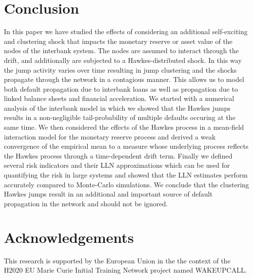 \documentclass[10pt]{article}
\theoremstyle{plain}
\theoremstyle{definition}
\newcommand{\<}{\langle}
\renewcommand{\>}{\rangle}
\renewcommand{\(}{\left(}
\renewcommand{\)}{\right)}
\renewcommand{\[}{\left[}
\renewcommand{\]}{\right]}
\begin{document}
\section{Conclusion}
In this paper we have studied the effects of considering an additional self-exciting and clustering shock that impacts the monetary reserve or asset value of the nodes of the interbank system. The nodes are assumed to interact through the drift, and additionally are subjected to a Hawkes-distributed shock. In this way the jump activity varies over time resulting in jump clustering and the shocks propagate through the network in a contagious manner. This allows us to model both default propagation due to interbank loans as well as propagation due to linked balance sheets and financial acceleration. We started with a numerical analysis of the interbank model in which we showed that the Hawkes jumps results in a non-negligible tail-probability of multiple defaults occuring at the same time. We then considered the effects of the Hawkes process in a mean-field interaction model for the monetary reserve process and derived a weak convergence of the empirical mean to a measure whose underlying process reflects the Hawkes process through a time-dependent drift term. Finally we defined several risk indicators and their LLN approximations which can be used for quantifying the risk in large systems and showed that the LLN estimates perform accurately compared to Monte-Carlo simulations. We conclude that the clustering Hawkes jumps result in an additional and important source of default propagation in the network and should not be ignored.

\section*{Acknowledgements}
This research is supported by the European Union in the the context of the H2020 EU Marie Curie Initial Training Network project named WAKEUPCALL.
\end{document}
